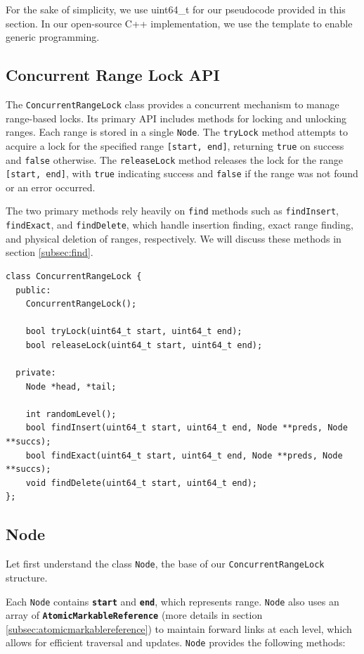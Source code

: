 For the sake of simplicity, we use uint64\_t for our pseudocode provided in this section.
In our open-source C++ implementation, we use the template to enable generic programming.

\subsection{Concurrent Range Lock API}\label{subsec:api}

The \texttt{ConcurrentRangeLock} class provides a concurrent mechanism to manage range-based locks.
Its primary API includes methods for locking and unlocking ranges.
Each range is stored in a single \texttt{Node}.
The \texttt{tryLock} method attempts to acquire a lock for the specified range \texttt{[start, end]}, returning \texttt{true} on success and \texttt{false} otherwise.
The \texttt{releaseLock} method releases the lock for the range \texttt{[start, end]}, with \texttt{true} indicating success and \texttt{false} if the range was not found or an error occurred.

The two primary methods rely heavily on \texttt{find} methods such as \texttt{findInsert}, \texttt{findExact}, and \texttt{findDelete}, which handle insertion finding, exact range finding, and physical deletion of ranges, respectively. We will discuss these methods in section \ref{subsec:find}.

\begin{lstlisting}[style=mystyle, caption=Concurrent Range Lock,label={}]
class ConcurrentRangeLock {
  public:
    ConcurrentRangeLock();

    bool tryLock(uint64_t start, uint64_t end);
    bool releaseLock(uint64_t start, uint64_t end);

  private:
    Node *head, *tail;

    int randomLevel();
    bool findInsert(uint64_t start, uint64_t end, Node **preds, Node **succs);
    bool findExact(uint64_t start, uint64_t end, Node **preds, Node **succs);
    void findDelete(uint64_t start, uint64_t end);
};
\end{lstlisting}

\subsection{Node}\label{subsec:node}

Let first understand the class \texttt{Node}, the base of our \texttt{ConcurrentRangeLock} structure.

Each \texttt{Node} contains \textbf{\texttt{start}} and \textbf{\texttt{end}}, which represents range.
\texttt{Node} also uses an array of \textbf{\texttt{AtomicMarkableReference}} (more details in section \ref{subsec:atomicmarkablereference}) to maintain forward links at each level, which allows for efficient traversal and updates. \texttt{Node} provides the following methods:

